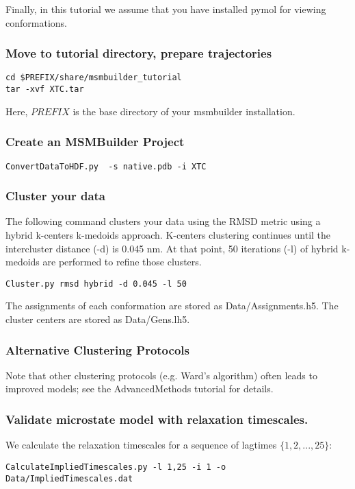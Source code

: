\documentclass[12pt]{article}
\begin{document}
Finally, in this tutorial we assume that you have installed pymol for viewing conformations.

\subsubsection{Move to tutorial directory, prepare trajectories}
\begin{verbatim}
cd $PREFIX/share/msmbuilder_tutorial 
tar -xvf XTC.tar
\end{verbatim}

Here, $PREFIX$ is the base directory of your msmbuilder installation.

\subsubsection{Create an MSMBuilder Project}
\begin{verbatim}
ConvertDataToHDF.py  -s native.pdb -i XTC
\end{verbatim}

\subsubsection{Cluster your data}
The following command clusters your data using the RMSD metric using a hybrid k-centers k-medoids approach.  K-centers clustering continues until the intercluster distance (-d) is 0.045 nm.  At that point, 50 iterations (-l) of hybrid k-medoids are performed to refine those clusters.

\begin{verbatim}
Cluster.py rmsd hybrid -d 0.045 -l 50
\end{verbatim}

The assignments of each conformation are stored as Data/Assignments.h5.  The cluster centers are stored as Data/Gens.lh5.  

\subsubsection{Alternative Clustering Protocols}

Note that other clustering protocols (e.g. Ward's algorithm) often leads to improved models; see the AdvancedMethods tutorial for details.  

\subsubsection{Validate microstate model with relaxation timescales.}
We calculate the relaxation timescales for a sequence of lagtimes $\{1, 2, ..., 25\}$:
\begin{verbatim}
CalculateImpliedTimescales.py -l 1,25 -i 1 -o Data/ImpliedTimescales.dat
\end{verbatim}
\end{document}
